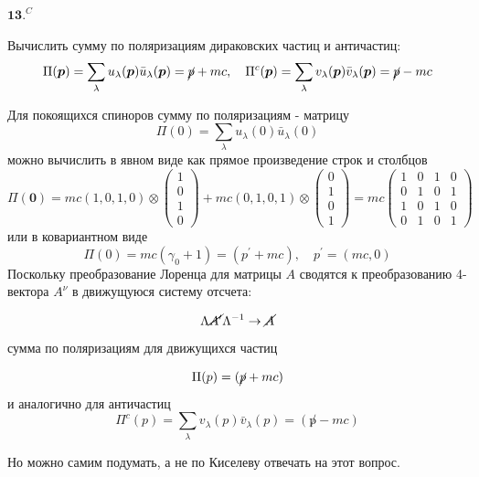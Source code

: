 \documentclass[a4paper,12pt]{article} %
\begin{document}
\begin{ttask}$\mathbf{1 3 .}^{C}$ 

Вычислить сумму по поляризациям дираковских частиц и античастиц:
$$
\Pi(\boldsymbol{p})=\sum_{\lambda} u_{\lambda}(\boldsymbol{p}) \bar{u}_{\lambda}(\boldsymbol{p})=\cancel p+m c, \quad \Pi^{c}(\boldsymbol{p})=
\sum_{\lambda} v_{\lambda}(\boldsymbol{p}) \bar{v}_{\lambda}(\boldsymbol{p})=\cancel p-m c
$$



Для покоящихся спиноров сумму по поляризациям - матрицу
$$
\Pi(0)=\sum_{\lambda} u_{\lambda}(0) \bar{u}_{\lambda}(0)
$$
можно вычислить в явном виде как прямое произведение строк и столбцов
$$
\Pi(\mathbf{0})=
mc (1,0,1,0) \otimes
\left(\begin{array}{l}
	1 \\
	0 \\
	1 \\
	0
\end{array}\right)
+
m c(0,1,0,1) 
\otimes
\left(\begin{array}{l}
	0 \\
	1 \\
	0 \\
	1
\end{array}\right)
=
m c
\left(\begin{array}{llll}
	1 & 0 & 1 & 0 \\
	0 & 1 & 0 & 1 \\
	1 & 0 & 1 & 0 \\
	0 & 1 & 0 & 1
\end{array}\right)
$$
или в ковариантном виде
$$
\Pi(0)=m c\left(\gamma_{0}+1\right)=\left(p^{\prime}+m c\right), \quad p^{\prime}=(m c, 0)
$$
Поскольку преобразование Лоренца для матрицы $A$ сводятся к преобразованию 4-вектора $A^{\nu}$ в движущуюся систему отсчета:


$$
\Lambda \cancel{A^{\prime}} \Lambda^{-1} \rightarrow \cancel{A}
$$
сумма по поляризациям для движущихся частиц 

$$
\Pi(p)=(\cancel{p}+m c)
$$
и аналогично для античастиц
$$
\Pi^{c}(p)=\sum_{\lambda} v_{\lambda}(p) \bar{v}_{\lambda}(p)=(\not p-m c)
$$










Но можно самим подумать, а не по Киселеву отвечать на этот вопрос.













\end{ttask}
\end{document}
